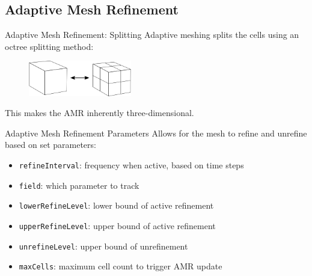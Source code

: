 \subsection{Adaptive Mesh Refinement}

\begin{frame}{Adaptive Mesh Refinement: Splitting}
Adaptive meshing splits the cells using an octree splitting method:
\begin{figure}[]
\centering
\includegraphics[width=0.4\textwidth]{../figs/amr_example.png}
\end{figure}%
This makes the AMR inherently three-dimensional. 
\end{frame}


\begin{frame}{Adaptive Mesh Refinement Parameters}
Allows for the mesh to refine and unrefine based on set parameters:
\begin{itemize}
\item \texttt{refineInterval}: frequency when active, based on time steps
\item \texttt{field}: which parameter to track
\item \texttt{lowerRefineLevel}: lower bound of active refinement 
\item \texttt{upperRefineLevel}: upper bound of active refinement
\item \texttt{unrefineLevel}: upper bound of unrefinement
\item \texttt{maxCells}: maximum cell count to trigger AMR update
\end{itemize}
\end{frame}

